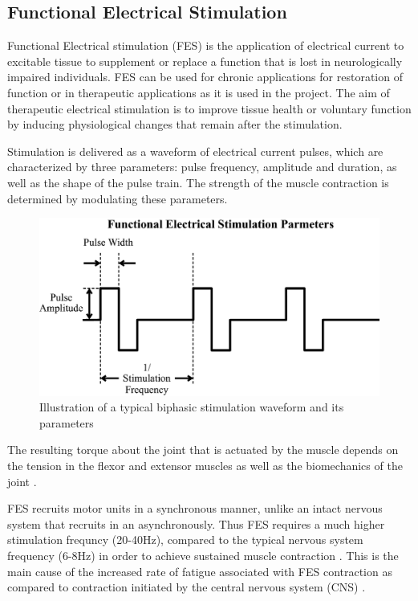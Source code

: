 




\subsection{Functional Electrical Stimulation}
Functional Electrical stimulation (FES) is the application of electrical current to excitable tissue to supplement or replace a function that is lost in neurologically impaired individuals. FES can be used for chronic applications for restoration of function or in therapeutic applications as it is used in the project. The aim of therapeutic electrical stimulation is to improve tissue health or voluntary function by inducing physiological changes that remain after the stimulation. 

Stimulation is delivered as a waveform of electrical current pulses, which are characterized by three parameters: pulse frequency, amplitude and duration, as well as the shape of the pulse train. The strength of the muscle contraction is determined by modulating these parameters.

\begin{figure} [H]
    \centering
    \includegraphics[width=0.7\linewidth]{images/stimpar.png}
    \caption{Illustration of a typical biphasic stimulation waveform and its parameters \cite{marquez-chin_functional_2020}}
    \label{fig:waveforms}
\end{figure}

The resulting torque about the joint that is actuated by the muscle depends on the tension in the flexor and extensor muscles as well as the biomechanics of the joint \cite{lynch_functional_2008}. 


FES recruits motor units in a synchronous manner, unlike an intact nervous system that recruits in an asynchronously. Thus FES requires a much higher stimulation frequncy (20-40Hz), compared to the typical nervous system frequency (6-8Hz) in order to achieve sustained muscle contraction \cite{lynch_functional_2008}. This is the main cause of the increased rate of fatigue associated with FES contraction as compared to contraction initiated by the central nervous system (CNS) \cite{gilman_handbook_1983}. 

